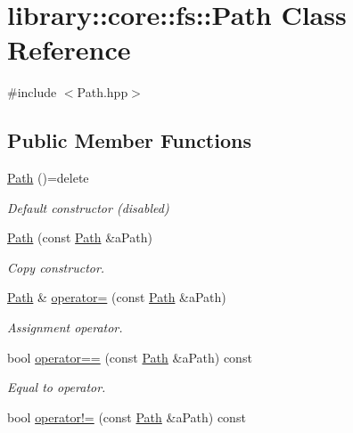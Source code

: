 \hypertarget{classlibrary_1_1core_1_1fs_1_1_path}{}\section{library\+:\+:core\+:\+:fs\+:\+:Path Class Reference}
\label{classlibrary_1_1core_1_1fs_1_1_path}


{\ttfamily \#include $<$Path.\+hpp$>$}

\subsection*{Public Member Functions}
\begin{DoxyCompactItemize}
\item 
\hyperlink{classlibrary_1_1core_1_1fs_1_1_path_aaba9a8e0153813f08f78f1c3275734a4}{Path} ()=delete
\begin{DoxyCompactList}\small\item\em Default constructor (disabled) \end{DoxyCompactList}\item 
\hyperlink{classlibrary_1_1core_1_1fs_1_1_path_aabc4240fc08479d1bff6b9753f2b5cc2}{Path} (const \hyperlink{classlibrary_1_1core_1_1fs_1_1_path}{Path} \&a\+Path)
\begin{DoxyCompactList}\small\item\em Copy constructor. \end{DoxyCompactList}\item 
\hyperlink{classlibrary_1_1core_1_1fs_1_1_path}{Path} \& \hyperlink{classlibrary_1_1core_1_1fs_1_1_path_a138827134fbe96f732c5708a6a331f89}{operator=} (const \hyperlink{classlibrary_1_1core_1_1fs_1_1_path}{Path} \&a\+Path)
\begin{DoxyCompactList}\small\item\em Assignment operator. \end{DoxyCompactList}\item 
bool \hyperlink{classlibrary_1_1core_1_1fs_1_1_path_add705556eb4509ab2868e322490a1e35}{operator==} (const \hyperlink{classlibrary_1_1core_1_1fs_1_1_path}{Path} \&a\+Path) const
\begin{DoxyCompactList}\small\item\em Equal to operator. \end{DoxyCompactList}\item 
bool \hyperlink{classlibrary_1_1core_1_1fs_1_1_path_a79b3a6951753c591bab57ee41f7c4c6f}{operator!=} (const \hyperlink{classlibrary_1_1core_1_1fs_1_1_path}{Path} \&a\+Path) const

\end{DoxyCompactItemize}
